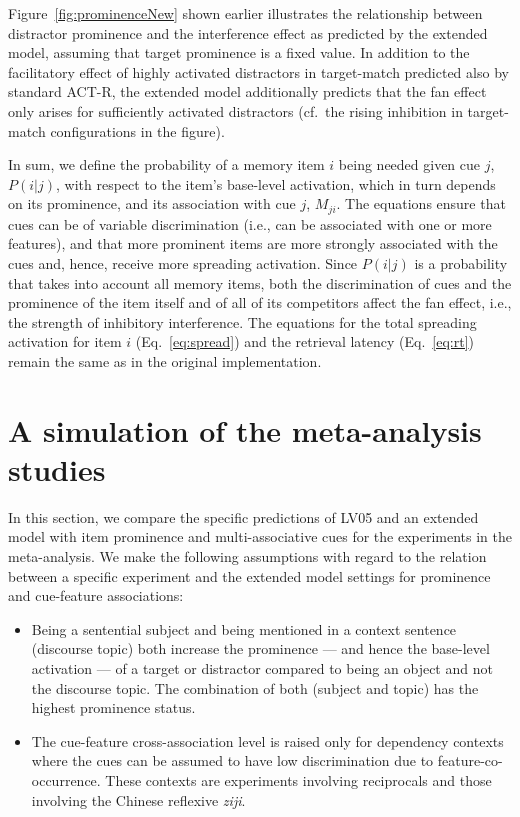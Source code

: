 \documentclass{cambridge7A}\usepackage[]{graphicx}\usepackage[]{color}
\begin{document}
Figure~\ref{fig:prominenceNew} shown earlier illustrates the relationship between distractor prominence and the interference effect as predicted by the extended model, assuming that target prominence is a fixed value. 
 In addition to the facilitatory effect of highly activated distractors in target-match predicted also by standard ACT-R, 
the extended model additionally predicts that the fan effect only arises for sufficiently activated distractors (cf.\ the rising inhibition in target-match configurations in the figure). 

In sum, we define the probability of a memory item $i$ being needed given cue $j$, $P(i|j)$, with respect to the item's base-level activation, which in turn depends on its prominence, and its association with cue $j$, $M_{ji}$. The equations ensure that cues can be of variable discrimination (i.e., can be associated with one or more features), and that more  prominent items are more strongly associated with the cues and, hence, receive more spreading activation. Since $P(i|j)$ is a probability that takes into account all memory items, both the discrimination of cues and the prominence of the item itself and of all of its competitors affect the fan effect, i.e., the strength of inhibitory interference. 
The equations for the total spreading activation for item $i$ (Eq.~\ref{eq:spread}) and the retrieval latency (Eq.~\ref{eq:rt}) remain the same as in the original implementation.

\section{A simulation of the meta-analysis studies}
\label{sec:sims}
In this section, we compare the specific predictions of LV05 and an extended model with item prominence and multi-associative cues for the experiments in the \cite{JaegerEngelmannVasishth2017} meta-analysis.
We make the following assumptions with regard to the relation between a specific experiment and the extended model settings for prominence and cue-feature associations:
\begin{itemize}
	\item Being a sentential subject and being mentioned in a context sentence  (discourse topic) both increase the prominence --- and hence the base-level activation --- of a target or distractor compared to being an object and not the discourse topic. The combination of both (subject and topic) has the highest prominence status.
	\item The cue-feature cross-association level is raised only for dependency contexts where the cues can be assumed to have low discrimination due to feature-co-occurrence. These contexts are experiments involving  reciprocals and those involving the  Chinese reflexive \textit{ziji}. 
\end{itemize}
\end{document}
